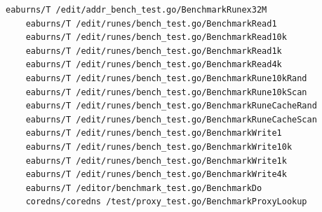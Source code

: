 \documentclass{seal_thesis}
\begin{document}
\begin{lstlisting}[basicstyle=\tiny]
	eaburns/T /edit/addr_bench_test.go/BenchmarkRunex32M
	eaburns/T /edit/runes/bench_test.go/BenchmarkRead1
	eaburns/T /edit/runes/bench_test.go/BenchmarkRead10k
	eaburns/T /edit/runes/bench_test.go/BenchmarkRead1k
	eaburns/T /edit/runes/bench_test.go/BenchmarkRead4k
	eaburns/T /edit/runes/bench_test.go/BenchmarkRune10kRand
	eaburns/T /edit/runes/bench_test.go/BenchmarkRune10kScan
	eaburns/T /edit/runes/bench_test.go/BenchmarkRuneCacheRand
	eaburns/T /edit/runes/bench_test.go/BenchmarkRuneCacheScan
	eaburns/T /edit/runes/bench_test.go/BenchmarkWrite1
	eaburns/T /edit/runes/bench_test.go/BenchmarkWrite10k
	eaburns/T /edit/runes/bench_test.go/BenchmarkWrite1k
	eaburns/T /edit/runes/bench_test.go/BenchmarkWrite4k
	eaburns/T /editor/benchmark_test.go/BenchmarkDo
	coredns/coredns /test/proxy_test.go/BenchmarkProxyLookup
\end{lstlisting}
\end{document}

